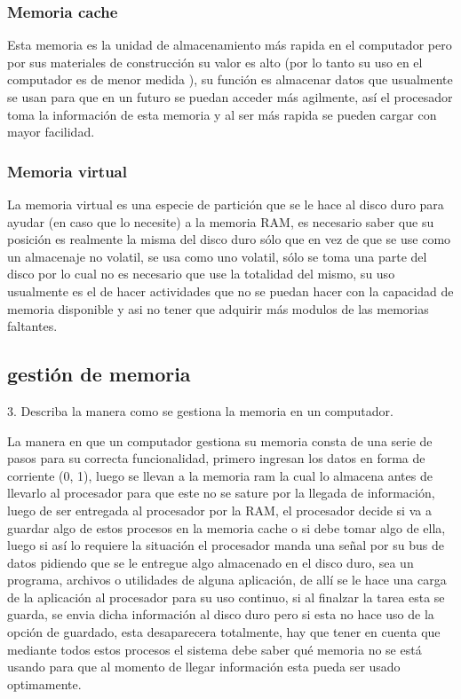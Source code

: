 \documentclass{article}
\begin{document}
\subsubsection{Memoria cache}
Esta memoria es la unidad de almacenamiento más rapida en el computador pero por sus materiales de construcción su valor es alto (por lo tanto su uso en el computador es de menor medida ), su función es almacenar datos que usualmente se usan para que en un futuro se puedan acceder más agilmente, así el procesador toma la información de esta memoria y al ser más rapida se pueden cargar con mayor facilidad.
\vfill
\vspace{0,0cm}
\subsubsection{Memoria virtual}
La memoria virtual es una especie de partición que se le hace al disco duro para ayudar (en caso que lo necesite) a la memoria RAM, es necesario saber que su posición es realmente la misma del disco duro sólo que en vez de que se use como un almacenaje no volatil, se usa como uno volatil, sólo se toma una parte del disco por lo cual no es necesario que use la totalidad del mismo, su uso usualmente es el de hacer actividades que no se puedan hacer con la capacidad de memoria disponible y asi no tener que adquirir más modulos de las memorias faltantes.

\subsection{gestión de memoria}
3. Describa la manera como se gestiona la memoria en un computador.\vspace{0.5cm}


La manera en que un computador gestiona su memoria consta de una serie de pasos para su correcta funcionalidad, primero ingresan los datos en forma de corriente (0, 1), luego se llevan a la memoria ram la cual lo almacena antes de llevarlo al procesador para que este no se sature por la llegada de información, luego de ser entregada al procesador por la RAM, el procesador decide si va a guardar algo de estos procesos en la memoria cache o si debe tomar algo de ella, luego si así lo requiere la situación el procesador manda una señal por su bus de datos pidiendo que se le entregue algo almacenado en el disco duro, sea un programa, archivos o utilidades de alguna aplicación, de allí se le hace una carga de la aplicación al procesador para su uso continuo, si al finalzar la tarea esta se guarda, se envia dicha información al disco duro pero si esta no hace uso de la opción de guardado, esta desaparecera totalmente, hay que tener en cuenta que mediante todos estos procesos el sistema debe saber qué memoria no se está usando para que al momento de llegar información esta pueda ser usado optimamente.
\end{document}
